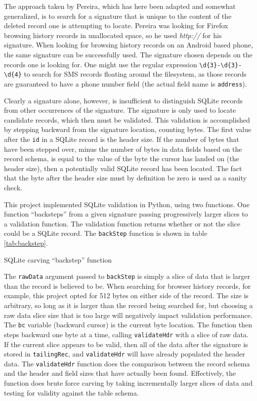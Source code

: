 The approach taken by Pereira, which has here been adapted and somewhat generalized, is to search for a signature that is unique to
the content of the deleted record one is attempting to locate.  Pereira was looking for Firefox browsing history records in
unallocated space, so he used \emph{http://} for his signature.  When looking for browsing history records on an Android based
phone, the same signature can be successfully used.  The signature chosen depends on the records one is looking for.  One might use
the regular expression \verb|\d{3}-\d{3}-\d{4}| to search for SMS records floating around the filesystem, as those records are guaranteed
to have a phone number field (the actual field name is \texttt{address}). 

Clearly a signature alone, however, is insufficient to distinguish SQLite records from other occurrences of the signature.  The
signature is only used to locate candidate records, which then must be validated.  This validation is accomplished by stepping
backward from the signature location, counting bytes.  The first value after the \texttt{id} in a SQLite record is the header size.
If the number of bytes that have been stepped over, minus the number of bytes in data fields based on the record schema, is equal to
the value of the byte the cursor has landed on (the header size), then a potentially valid SQLite record has been located.  The fact
that the byte after the header size must by definition be zero is used as a sanity check.

This project implemented SQLite validation in Python, using two functions.  One function ``backsteps'' from a given signature
passing progressively larger slices to a validation function.  The validation function returns whether or not the slice could be a
SQLite record.  The \texttt{backStep} function is shown in table \ref{tab:backstep}. 

\begin{table}[htpb]

\caption{SQLite carving ``backstep'' function}
\label{tab:backstep}
\end{table}

The \texttt{rawData} argument passed to \texttt{backStep} is simply a slice of data that is larger than the record is believed to
be.  When searching for browser history records, for example, this project opted for 512 bytes on either side of the record.  The
size is arbitrary, so long as it is larger than the record being searched for, but choosing a raw data slice size that is too large
will negatively impact validation performance.  The \texttt{bc} variable (backward cursor) is the current byte location.  The
function then steps backward one byte at a time, calling \texttt{validateHdr} with a slice of raw data.  If the current
slice appears to be valid, then all of the data after the signature is stored in \texttt{tailingRec}, and \texttt{validateHdr} will
have already populated the header data.  The \texttt{validateHdr} function does the comparison between the record schema and
the header and field sizes that have actually been found.  Effectively, the function does brute force carving by taking
incrementally larger slices of data and testing for validity against the table schema.

